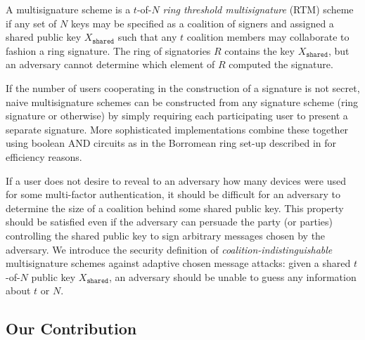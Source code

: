 \documentclass{mrl}
\theoremstyle{definition}
\begin{document}
A multisignature scheme is a $t$-of-$N$ \textit{ring threshold multisignature} (RTM) scheme if any set of $N$ keys may be specified as a coalition of signers and assigned a shared public key $X_{\texttt{shared}}$ such that any $t$ coalition members may collaborate to fashion a ring signature. The ring of signatories $R$  contains the key $X_{\texttt{shared}}$, but an adversary cannot determine which element of $R$ computed the signature. 

If the number of users cooperating in the construction of a signature is not secret, naive multisignature schemes can be constructed from any signature scheme (ring signature or otherwise) by simply requiring each participating user to present a separate signature. More sophisticated implementations combine these together using boolean AND circuits as in the Borromean ring set-up described in \cite{} for efficiency reasons. 

If a user does not desire to reveal to an adversary how many devices were used for some multi-factor authentication, it should be difficult for an adversary to determine the size of a coalition behind some shared public key. This property should be satisfied even if the adversary can persuade the party (or parties) controlling the shared public key to sign arbitrary messages chosen by the adversary. We introduce the security definition of \textit{coalition-indistinguishable} multisignature schemes against adaptive chosen message attacks: given a shared $t$-of-$N$ public key $X_{\texttt{shared}}$, an adversary should be unable to guess any information about $t$ or $N$. %




\subsection{Our Contribution}
\end{document}
